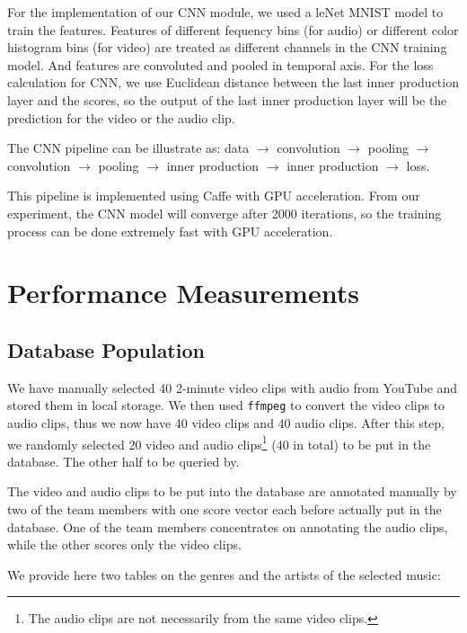\documentclass{report}
\begin{document}
For the implementation of our CNN module, we used a leNet MNIST model to train the features. Features of different fequency bins (for audio) or different color histogram bins (for video) are treated as different channels in the CNN training model. And features are convoluted and pooled in temporal axis. For the loss calculation for CNN, we use Euclidean distance between the last inner production layer and the scores, so the output of the last inner production layer will be the prediction for the video or the audio clip.

The CNN pipeline can be illustrate as: data $\rightarrow$ convolution $\rightarrow$ pooling $\rightarrow$ convolution $\rightarrow$ pooling $\rightarrow$ inner production $\rightarrow$ inner production $\rightarrow$ loss.

This pipeline is implemented using Caffe with GPU acceleration. From our experiment, the CNN model will converge after 2000 iterations, so the training process can be done extremely fast with GPU acceleration.


\chapter{Performance Measurements}
\label{ch:eval}

\section{Database Population}

We have manually selected 40 2-minute video clips with audio from YouTube and stored them in local storage. We then used \texttt{ffmpeg} to convert the video clips to audio clips, thus we now have 40 video clips and 40 audio clips. After this step, we randomly selected 20 video and audio clips\footnote{The audio clips are not necessarily from the same video clips.} (40 in total) to be put in the database. The other half to be queried by.

The video and audio clips to be put into the database are annotated manually by two of the team members with one score vector each before actually put in the database. One of the team members concentrates on annotating the audio clips, while the other scores only the video clips.

We provide here two tables on the genres and the artists of the selected music:
\end{document}
